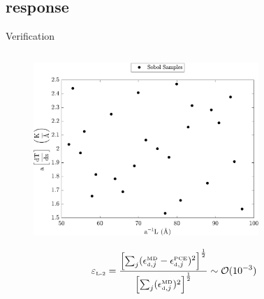 \documentclass[xcolor={x11names,table},compress,svgnames,mathserif]{beamer}
\renewcommand{\(}{\begin{columns}}
\renewcommand{\)}{\end{columns}}
\newcommand{\<}[1]{\begin{column}{#1}}
\renewcommand{\>}{\end{column}}
\newcommand{\be}{\begin{equation}}
\newcommand{\ee}{\end{equation}}
\begin{document}
\subsection{response}
\begin{frame}{Verification}

\begin{columns}
\begin{column}{0.5\textwidth}
\vspace{-1mm}
\begin{center}
\begin{figure}[htbp]
  \includegraphics[width=0.8\textwidth]{./Figures/err2D_s}
  \end{figure}
\end{center}
\scriptsize

\begin{center}
\begin{tcolorbox}[width=1.1\textwidth,colback=DeepSkyBlue!20,notitle,colframe=DeepSkyBlue!20,colupper=DeepSkyBlue4]
\vspace{-3mm}
\scriptsize
\be
 \varepsilon_{\tiny{\mbox{L-2}}} = \frac{\left[\sum_{j}(\epsilon_{\tiny{\mbox{d},j}}^{\mbox{\tiny{MD}}} - 
 \epsilon_{\tiny{\mbox{d},j}}^{\mbox{\tiny{PCE}}})^2\right]^{\frac{1}{2}}}{\left[\sum_j(\epsilon_{\tiny{\mbox{d},j}}
 ^{\mbox{\tiny{MD}}})^2\right]^{\frac{1}{2}}} \sim \mathcal{O}(10^{-3}) \nonumber
 \ee
\end{tcolorbox}
\end{center}

\end{column}

\begin{column}{0.5\textwidth}


\end{column}
\end{columns}
\end{frame}
\end{document}
